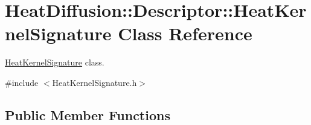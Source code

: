 \hypertarget{classHeatDiffusion_1_1Descriptor_1_1HeatKernelSignature}{\section{Heat\-Diffusion\-:\-:Descriptor\-:\-:Heat\-Kernel\-Signature Class Reference}
\label{classHeatDiffusion_1_1Descriptor_1_1HeatKernelSignature}
}


\hyperlink{classHeatDiffusion_1_1Descriptor_1_1HeatKernelSignature}{Heat\-Kernel\-Signature} class.  




{\ttfamily \#include $<$Heat\-Kernel\-Signature.\-h$>$}

\subsection*{Public Member Functions}
